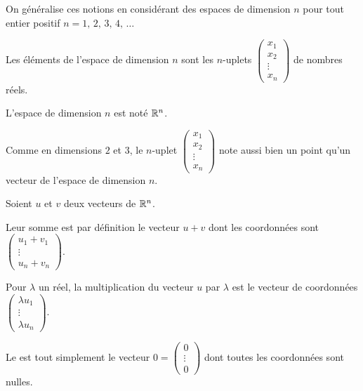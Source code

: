 \diapo

On généralise ces notions en considérant des espaces de dimension $n$ 
pour tout entier positif $n = 1,\, 2,\, 3,\, 4,\, \dots$

\change
Les éléments de l'espace de dimension $n$ sont les $n$-uplets
$\left(\begin{smallmatrix} x_1\\ x_2 \\ \vdots \\ x_n \end{smallmatrix}\right)$ 
de nombres réels. 

\change
L'espace de dimension $n$ est noté $\mathbb{R}^n$. 

\change
Comme en dimensions $2$ et $3$, le $n$-uplet
$\left(\begin{smallmatrix} x_1\\x_2 \\  \vdots \\ x_n \end{smallmatrix}\right)$
note aussi bien un point qu'un vecteur de l'espace de dimension $n$. 



\diapo

Soient $u$ et $v$ deux vecteurs de $\mathbb{R}^n$. 

\change

Leur somme est par définition le vecteur 
$u + v$ dont les coordonnées sont 
$\begin{pmatrix}u_1 + v_1 \\ \vdots \\ u_n + v_n\end{pmatrix}.$

\change
Pour $\lambda$ un réel, la multiplication du vecteur $u$ par $\lambda$
est le vecteur de coordonnées 
$\begin{pmatrix}\lambda u_1 \\ \vdots \\ \lambda u_n \end{pmatrix}.$

\change
Le  est tout simplement le vecteur 
$0 = \left(\begin{smallmatrix} 0 \\ \vdots \\ 0 \end{smallmatrix}\right)$
dont toutes les coordonnées sont nulles.
  

